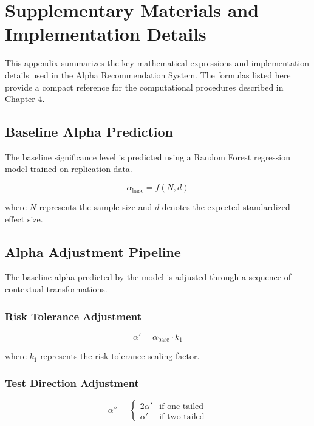 \appendix
\chapter{Supplementary Materials and Implementation Details}

\renewcommand{\theequation}{A.\arabic{equation}}
\setcounter{equation}{0}

This appendix summarizes the key mathematical expressions and
implementation details used in the Alpha Recommendation System.
The formulas listed here provide a compact reference for the
computational procedures described in Chapter 4.

\section{Baseline Alpha Prediction}

The baseline significance level is predicted using a Random Forest
regression model trained on replication data.

\begin{equation}
	\alpha_{\text{base}} = f(N,d)
\end{equation}

where $N$ represents the sample size and $d$ denotes the expected
standardized effect size.

\section{Alpha Adjustment Pipeline}

The baseline alpha predicted by the model is adjusted through a
sequence of contextual transformations.

\subsection{Risk Tolerance Adjustment}

\begin{equation}
	\alpha' = \alpha_{\text{base}} \cdot k_1
\end{equation}

where $k_1$ represents the risk tolerance scaling factor.

\subsection{Test Direction Adjustment}

\begin{equation}
	\alpha'' =
	\begin{cases}
		2\alpha' & \text{if one-tailed}\\
		\alpha' & \text{if two-tailed}
	\end{cases}
\end{equation}

